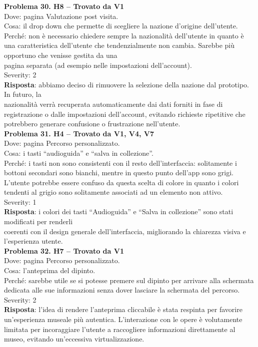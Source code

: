 \documentclass{article}
\begin{document}
\noindent \textbf{Problema 30. H8 – Trovato da V1} \\
Dove: pagina Valutazione post visita. \\
Cosa: il drop down che permette di scegliere la nazione d’origine dell’utente. \\
Perché: non è necessario chiedere sempre la nazionalità dell’utente in quanto è una caratteristica dell’utente che tendenzialmente non cambia. Sarebbe più opportuno che venisse gestita da una \\ pagina separata (ad esempio nelle impostazioni dell’account). \\
Severity: 2 \\
\textbf{Risposta}: abbiamo deciso di rimuovere la selezione della nazione dal prototipo. In futuro, la \\nazionalità verrà recuperata automaticamente dai dati forniti in fase di registrazione o dalle impostazioni dell’account, evitando richieste ripetitive che potrebbero generare confusione o frustrazione nell’utente.\\

\noindent \textbf{Problema 31. H4 – Trovato da V1, V4, V7} \\
Dove: pagina Percorso personalizzato. \\
Cosa: i tasti “audioguida” e “salva in collezione”. \\
Perché: i tasti non sono consistenti con il resto dell’interfaccia: solitamente i bottoni secondari sono bianchi, mentre in questo punto dell’app sono grigi. L’utente potrebbe essere confuso da questa scelta di colore in quanto i colori tendenti al grigio sono solitamente associati ad un elemento non attivo. \\
Severity: 1 \\
\textbf{Risposta}: i colori dei tasti “Audioguida” e “Salva in collezione” sono stati modificati per renderli \\ coerenti con il design generale dell’interfaccia, migliorando la chiarezza visiva e l’esperienza utente.\\

\noindent \textbf{Problema 32. H7 – Trovato da V1} \\
Dove: pagina Percorso personalizzato. \\
Cosa: l’anteprima del dipinto. \\
Perché: sarebbe utile se si potesse premere sul dipinto per arrivare alla schermata dedicata alle sue informazioni senza dover lasciare la schermata del percorso. \\
Severity: 2 \\
\textbf{Risposta}: l’idea di rendere l’anteprima cliccabile è stata respinta per favorire un’esperienza museale più autentica. L’interazione con le opere è volutamente limitata per incoraggiare l’utente a raccogliere informazioni direttamente al museo, evitando un’eccessiva virtualizzazione.\\
\end{document}
